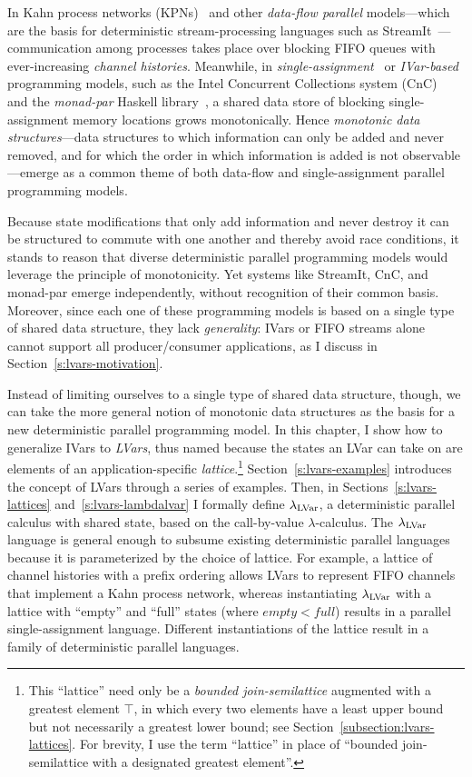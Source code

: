 In Kahn process networks (KPNs)~\cite{Kahn-1974} and other
\emph{data-flow parallel} models---which are the basis for
deterministic stream-processing languages such as
StreamIt~\cite{streamit-asplos}---communication among processes takes
place over blocking FIFO queues with ever-increasing \emph{channel
  histories}.  Meanwhile, in
\emph{single-assignment}~\cite{Tesler-1968} or
\emph{IVar-based}~\cite{IStructures} programming models, such as the
Intel Concurrent Collections system (CnC)~\cite{CnC} and the
\emph{monad-par} Haskell library~\cite{monad-par}, a shared data store
of blocking single-assignment memory locations grows monotonically.
Hence \emph{monotonic data structures}---data structures to which
information can only be added and never removed, and for which the
order in which information is added is not observable---emerge as a
common theme of both data-flow and single-assignment parallel
programming models.

Because state modifications that only add information and never
destroy it can be structured to commute with one another and thereby
avoid race conditions, it stands to reason that diverse deterministic
parallel programming models would leverage the principle of
monotonicity.  Yet systems like StreamIt, CnC, and monad-par emerge
independently, without recognition of their common basis.  Moreover,
since each one of these programming models is based on a single type
of shared data structure, they lack \emph{generality}: IVars or FIFO
streams alone cannot support all producer/consumer applications, as I
discuss in Section~\ref{s:lvars-motivation}.

Instead of limiting ourselves to a single type of shared data
structure, though, we can take the more general notion of monotonic
data structures as the basis for a new deterministic parallel
programming model.  In this chapter, I show how to generalize IVars
to \emph{LVars}, thus named because the states an LVar can take on are
elements of an application-specific \emph{lattice}.\footnote{This
``lattice'' need only be a \emph{bounded join-semilattice} augmented
with a greatest element $\top$, in which every two elements have a
least upper bound but not necessarily a greatest lower bound; see
Section~\ref{subsection:lvars-lattices}.  For brevity, I use the term
``lattice'' in place of ``bounded join-semilattice with a designated
greatest element''.}  Section~\ref{s:lvars-examples} introduces the
concept of LVars through a series of examples.  Then, in
Sections~\ref{s:lvars-lattices} and~\ref{s:lvars-lambdalvar} I
formally define $\lambda_{\textrm{LVar}}$, a deterministic parallel calculus with
shared state, based on the call-by-value $\lambda$-calculus.  The
$\lambda_{\textrm{LVar}}$ language is general enough to subsume existing
deterministic parallel languages because it is parameterized by the
choice of lattice.  For example, a lattice of channel histories with a
prefix ordering allows LVars to represent FIFO channels that implement
a Kahn process network, whereas instantiating $\lambda_{\textrm{LVar}}$ with a
lattice with ``empty'' and ``full'' states (where $\mathit{empty} <
\mathit{full}$) results in a parallel single-assignment language.
Different instantiations of the lattice result in a family of
deterministic parallel languages.

